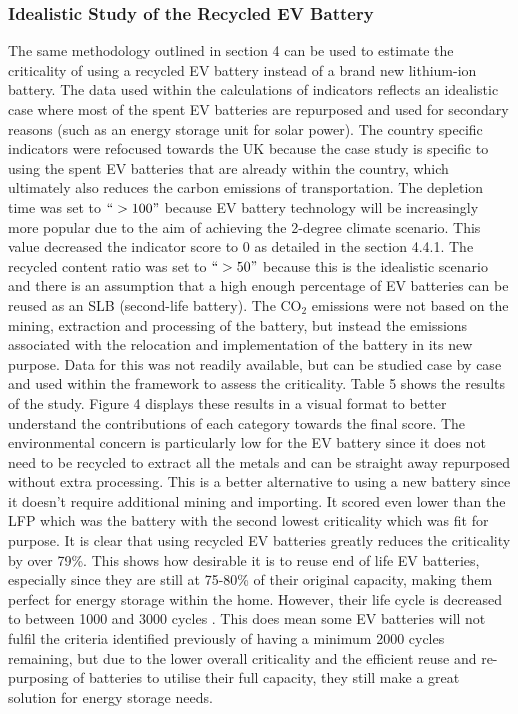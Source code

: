 \documentclass{article}
\begin{document}
\subsubsection{Idealistic Study of the Recycled EV Battery}

The same methodology outlined in section 4 can be used to estimate the criticality of using a recycled EV battery instead of a brand new lithium-ion battery. The data used within the calculations of indicators reflects an idealistic case where most of the spent EV batteries are repurposed and used for secondary reasons (such as an energy storage unit for solar power). The country specific indicators were refocused towards the UK because the case study is specific to using the spent EV batteries that are already within the country, which ultimately also reduces the carbon emissions of transportation. The depletion time was set to $``>100" $ because EV battery technology will be increasingly more popular due to the aim of achieving the 2-degree climate scenario. This value decreased the indicator score to 0 as detailed in the section 4.4.1. The recycled content ratio was set to $``>50"$ because this is the idealistic scenario and there is an assumption that a high enough percentage of EV batteries can be reused as an SLB (second-life battery). The CO$_{2}$ emissions were not based on the mining, extraction and processing of the battery, but instead the emissions associated with the relocation and implementation of the battery in its new purpose. Data for this was not readily available, but can be studied case by case and used within the framework to assess the criticality. Table 5 shows the results of the study. Figure 4 displays these results in a visual format to better understand the contributions of each category towards the final score. The environmental concern is particularly low for the EV battery since it does not need to be recycled to extract all the metals and can be straight away repurposed without extra processing. This is a better alternative to using a new battery since it doesn't require additional mining and importing. It scored even lower than the LFP which was the battery with the second lowest criticality which was fit for purpose. It is clear that using recycled EV batteries greatly reduces the criticality by over 79\%. This shows how desirable it is to reuse end of life EV batteries, especially since they are still at 75-80\% of their original capacity, making them perfect for energy storage within the home. However, their life cycle is decreased to between 1000 and 3000 cycles \cite{liu2022overview}. This does mean some EV batteries will not fulfil the criteria identified previously of having a minimum 2000 cycles remaining, but due to the lower overall criticality and the efficient reuse and re-purposing of batteries to utilise their full capacity, they still make a great solution for energy storage needs.
\end{document}
